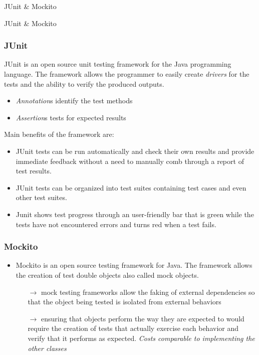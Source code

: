 \documentclass{beamer}
\theoremstyle{definition}
\begin{document}
\begin{section}{JUnit \& Mockito}
	\begin{subsection}{JUnit \& Mockito}
		
		\begin{frame}
			
			\frametitle{JUnit}
			{\small 
				JUnit is an open source unit testing framework for the Java programming language.
				The framework allows the programmer to easily create \textit{drivers} for the tests and the ability to verify the produced outputs. 
				\begin{itemize}
					
					\item \textit{Annotation}s identify the test methods 
					\item \textit{Assertion}s tests for expected results
					
				\end{itemize}
				Main benefits of the framework are: \begin{itemize}
					\item JUnit tests can be run automatically and check their own results and provide immediate feedback without a need to manually comb through a report of test results.
					
					\item JUnit tests can be organized into test suites containing test cases and even other test suites.
					
					\item Junit shows test progress through an user-friendly bar that is green while the tests have not encountered errors and turns red when a test fails.
					
				\end{itemize}}
			\end{frame}
			\begin{frame}
				\frametitle{Mockito}
				\begin{itemize}
			\item Mockito is an open source testing framework for Java. The framework allows the creation of test double objects also called mock objects.
					
		\begin{itemize}
				\item[$ \rightarrow $] mock testing frameworks allow the faking of external dependencies so that the object being tested is isolated from external behaviors
				
				 \item[$ \rightarrow $] ensuring that objects perform the way they are expected to would require the creation of tests that actually exercise each behavior and verify that it performs as expected. \textit{Costs comparable to implementing the other classes}
				

\end{itemize}
\end{itemize}
\end{frame}
\end{subsection}
\end{section}
\end{document}
